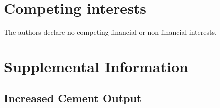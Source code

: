 \documentclass[12pt, a4paper]{article} %
\newcommand{\Suppl}{Supplemental}
\begin{document}
\section*{Competing interests}
The authors declare no competing financial or non-financial interests.

\newpage
\appendix
\renewcommand{\thefootnote}{\arabic{footnote}}
\renewcommand{\figurename}{\Suppl$ $ Figure}
\renewcommand{\tablename}{\Suppl$ $ Table}
\renewcommand{\refname}{\Suppl$ $ References}
\renewcommand{\thesubsection}{\Suppl$ $ Note \arabic{subsection}}
\setcounter{footnote}{0}
\setcounter{section}{0}
\setcounter{figure}{0}
\setcounter{table}{0}




\section*{\Suppl$ $ Information}

\subsection{Increased Cement Output}
\label{sec: sn-increased}
\end{document}
